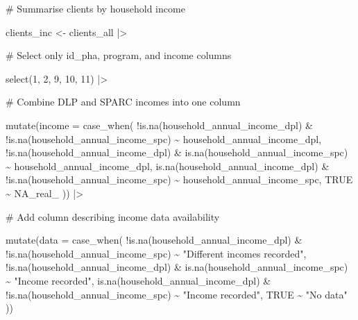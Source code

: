 \documentclass[
  letterpaper,
  DIV=11,
  numbers=noendperiod]{scrartcl}
\newenvironment{Shaded}{\begin{snugshade}}{\end{snugshade}}
\newcommand{\AttributeTok}[1]{\textcolor[rgb]{0.40,0.45,0.13}{#1}}
\newcommand{\CommentTok}[1]{\textcolor[rgb]{0.37,0.37,0.37}{#1}}
\newcommand{\ConstantTok}[1]{\textcolor[rgb]{0.56,0.35,0.01}{#1}}
\newcommand{\DecValTok}[1]{\textcolor[rgb]{0.68,0.00,0.00}{#1}}
\newcommand{\FunctionTok}[1]{\textcolor[rgb]{0.28,0.35,0.67}{#1}}
\newcommand{\NormalTok}[1]{\textcolor[rgb]{0.00,0.23,0.31}{#1}}
\newcommand{\OtherTok}[1]{\textcolor[rgb]{0.00,0.23,0.31}{#1}}
\newcommand{\SpecialCharTok}[1]{\textcolor[rgb]{0.37,0.37,0.37}{#1}}
\newcommand{\StringTok}[1]{\textcolor[rgb]{0.13,0.47,0.30}{#1}}
\begin{document}
\begin{Shaded}
\begin{Highlighting}[]
\CommentTok{\# Summarise clients by household income}

\NormalTok{clients\_inc }\OtherTok{\textless{}{-}}\NormalTok{ clients\_all }\SpecialCharTok{|\textgreater{}} 
  
  \CommentTok{\# Select only id\_pha, program, and income columns}
  
  \FunctionTok{select}\NormalTok{(}\DecValTok{1}\NormalTok{, }\DecValTok{2}\NormalTok{, }\DecValTok{9}\NormalTok{, }\DecValTok{10}\NormalTok{, }\DecValTok{11}\NormalTok{) }\SpecialCharTok{|\textgreater{}} 
  
  \CommentTok{\# Combine DLP and SPARC incomes into one column}
  
  \FunctionTok{mutate}\NormalTok{(}\AttributeTok{income =} \FunctionTok{case\_when}\NormalTok{(}
    \SpecialCharTok{!}\FunctionTok{is.na}\NormalTok{(household\_annual\_income\_dpl) }\SpecialCharTok{\&} \SpecialCharTok{!}\FunctionTok{is.na}\NormalTok{(household\_annual\_income\_spc) }\SpecialCharTok{\textasciitilde{}}\NormalTok{ household\_annual\_income\_dpl,}
    \SpecialCharTok{!}\FunctionTok{is.na}\NormalTok{(household\_annual\_income\_dpl) }\SpecialCharTok{\&} \FunctionTok{is.na}\NormalTok{(household\_annual\_income\_spc) }\SpecialCharTok{\textasciitilde{}}\NormalTok{ household\_annual\_income\_dpl,}
    \FunctionTok{is.na}\NormalTok{(household\_annual\_income\_dpl) }\SpecialCharTok{\&} \SpecialCharTok{!}\FunctionTok{is.na}\NormalTok{(household\_annual\_income\_spc) }\SpecialCharTok{\textasciitilde{}}\NormalTok{ household\_annual\_income\_spc,}
    \ConstantTok{TRUE} \SpecialCharTok{\textasciitilde{}} \ConstantTok{NA\_real\_}
\NormalTok{  )) }\SpecialCharTok{|\textgreater{}} 
  
  \CommentTok{\# Add column describing income data availability}
  
  \FunctionTok{mutate}\NormalTok{(}\AttributeTok{data =} \FunctionTok{case\_when}\NormalTok{(}
    \SpecialCharTok{!}\FunctionTok{is.na}\NormalTok{(household\_annual\_income\_dpl) }\SpecialCharTok{\&} \SpecialCharTok{!}\FunctionTok{is.na}\NormalTok{(household\_annual\_income\_spc) }\SpecialCharTok{\textasciitilde{}} \StringTok{"Different incomes recorded"}\NormalTok{,}
    \SpecialCharTok{!}\FunctionTok{is.na}\NormalTok{(household\_annual\_income\_dpl) }\SpecialCharTok{\&} \FunctionTok{is.na}\NormalTok{(household\_annual\_income\_spc) }\SpecialCharTok{\textasciitilde{}} \StringTok{"Income recorded"}\NormalTok{,}
    \FunctionTok{is.na}\NormalTok{(household\_annual\_income\_dpl) }\SpecialCharTok{\&} \SpecialCharTok{!}\FunctionTok{is.na}\NormalTok{(household\_annual\_income\_spc) }\SpecialCharTok{\textasciitilde{}} \StringTok{"Income recorded"}\NormalTok{,}
    \ConstantTok{TRUE} \SpecialCharTok{\textasciitilde{}} \StringTok{"No data"}
\NormalTok{  )) }


\end{Highlighting}
\end{Shaded}
\end{document}
